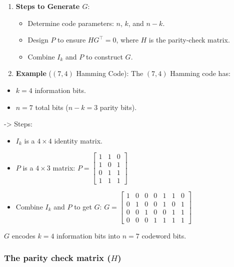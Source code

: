 \documentclass[11pt]{article}
\providecommand{\tightlist}{%
      \setlength{\itemsep}{0pt}\setlength{\parskip}{0pt}}
\begin{document}
\begin{enumerate}
\def\labelenumi{\arabic{enumi}.}
\setcounter{enumi}{3}
\tightlist
\item
  \textbf{Steps to Generate \(G\)}:

  \begin{itemize}
  \tightlist
  \item
    Determine code parameters: \(n\), \(k\), and \(n-k\).
  \item
    Design \(P\) to ensure \(H G^\top = 0\), where \(H\) is the
    parity-check matrix.
  \item
    Combine \(I_k\) and \(P\) to construct \(G\).
  \end{itemize}
\item
  \textbf{Example} (\((7, 4)\) Hamming Code): The \((7, 4)\) Hamming
  code has:
\end{enumerate}

\begin{itemize}
\tightlist
\item
  \(k = 4\) information bits.
\item
  \(n = 7\) total bits (\(n - k = 3\) parity bits).
\end{itemize}

-\textgreater{} Steps:

\begin{itemize}
\item
  \(I_k\) is a \(4 \times 4\) identity matrix.
\item
  \(P\) is a \(4 \times 3\) matrix:
  \(P = \begin{bmatrix} 1 & 1 & 0 \\ 1 & 0 & 1 \\ 0 & 1 & 1 \\ 1 & 1 & 1 \end{bmatrix}\)
\item
  Combine \(I_k\) and \(P\) to get \(G\):
  \(G = \begin{bmatrix} 1 & 0 & 0 & 0 & 1 & 1 & 0 \\ 0 & 1 & 0 & 0 & 1 & 0 & 1 \\ 0 & 0 & 1 & 0 & 0 & 1 & 1 \\ 0 & 0 & 0 & 1 & 1 & 1 & 1 \end{bmatrix}\)
\end{itemize}

\(G\) encodes \(k = 4\) information bits into \(n = 7\) codeword bits.

    \subsubsection{\texorpdfstring{The \textbf{parity check matrix}
(\(H\))}{The parity check matrix (H)}}\label{the-parity-check-matrix-h}
\end{document}
